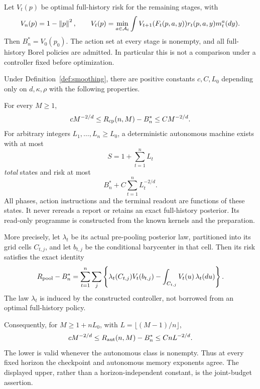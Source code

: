 Let $V_t(p)$ be optimal full-history risk for the remaining stages, with
\begin{equation}\label{eq:bellman}
 V_n(p)=1-\left\lVert p\right\rVert^2,\qquad
 V_t(p)=\min_{a\in\mathcal A_t}\int V_{t+1}(F_t(p,a,y))r_t(p,a,y)m_t^a(dy).
\end{equation}
Then $B_n^*=V_0(p_0)$. The action set at every stage is nonempty, and all full-history Borel policies are admitted. In particular this is not a comparison under a controller fixed before optimization.

\begin{theorem}\label{thm:pooling}
Under Definition~\ref{def:smoothing}, there are positive constants $c,C,L_0$ depending only on $d,\kappa,\rho$ with the following properties.

For every $M\ge1$,
\begin{equation}\label{eq:cprate}
 cM^{-2/d}\le R_{\mathrm{cp}}(n,M)-B_n^*\le CM^{-2/d}.
\end{equation}
For arbitrary integers $L_1,\ldots,L_n\ge L_0$, a deterministic autonomous machine exists with at most
\begin{equation}\label{eq:totalstates}
 S=1+\sum_{t=1}^n L_t
\end{equation}
\emph{total} states and risk at most
\begin{equation}\label{eq:poolrate}
 B_n^*+C\sum_{t=1}^n L_t^{-2/d}.
\end{equation}
All phases, action instructions and the terminal readout are functions of these states. It never rereads a report or retains an exact full-history posterior. Its read-only programme is constructed from the known kernels and the preparation.

More precisely, let $\lambda_t$ be its actual pre-pooling posterior law, partitioned into its grid cells $C_{t,j}$, and let $b_{t,j}$ be the conditional barycenter in that cell. Then its risk satisfies the exact identity
\begin{equation}\label{eq:poolidentity}
 R_{\rm pool}-B_n^*=
 \sum_{t=1}^n\sum_j\left\{
 \lambda_t(C_{t,j})V_t(b_{t,j})-
            \int_{C_{t,j}}V_t(u)\,\lambda_t(du)\right\}.
\end{equation}
The law $\lambda_t$ is induced by the constructed controller, not borrowed from an optimal full-history policy.

Consequently, for $M\ge1+nL_0$, with $L=\lfloor(M-1)/n\rfloor$,
\begin{equation}\label{eq:autrate}
 cM^{-2/d}\le R_{\mathrm{aut}}(n,M)-B_n^*\le CnL^{-2/d}.
\end{equation}
The lower is valid whenever the autonomous class is nonempty. Thus at every fixed horizon the checkpoint and autonomous memory exponents agree. The displayed upper, rather than a horizon-independent constant, is the joint-budget assertion.
\end{theorem}

